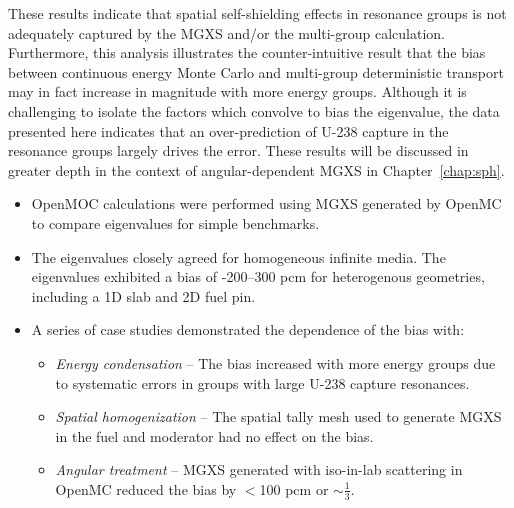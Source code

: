 These results indicate that spatial self-shielding effects in resonance groups is not adequately captured by the \ac{MGXS} and/or the multi-group calculation. Furthermore, this analysis illustrates the counter-intuitive result that the bias between continuous energy Monte Carlo and multi-group deterministic transport may in fact increase in magnitude with more energy groups. Although it is challenging to isolate the factors which convolve to bias the eigenvalue, the data presented here indicates that an over-prediction of U-238 capture in the resonance groups largely drives the error. These results will be discussed in greater depth in the context of angular-dependent \ac{MGXS} in Chapter~\ref{chap:sph}.

\clearpage

\vfill
\begin{highlightsbox}[frametitle=Highlights]
\begin{itemize}
  \item OpenMOC calculations were performed using \ac{MGXS} generated by OpenMC to compare eigenvalues for simple benchmarks.
  \item The eigenvalues closely agreed for homogeneous infinite media. The eigenvalues exhibited a bias of -200--300 \ac{pcm} for heterogenous geometries, including a 1D slab and 2D fuel pin.
  \item A series of case studies demonstrated the dependence of the bias with:
  \begin{itemize}
    \item \textit{Energy condensation} -- The bias increased with more energy groups due to systematic errors in groups with large U-238 capture resonances.
    \item \textit{Spatial homogenization} -- The spatial tally mesh used to generate \ac{MGXS} in the fuel and moderator had no effect on the bias.
    \item \textit{Angular treatment} -- \ac{MGXS} generated with iso-in-lab scattering in OpenMC reduced the bias by $<$100 \ac{pcm} or $\sim\frac{1}{3}$.
  \end{itemize} 
\end{itemize}
\end{highlightsbox}
\vfill